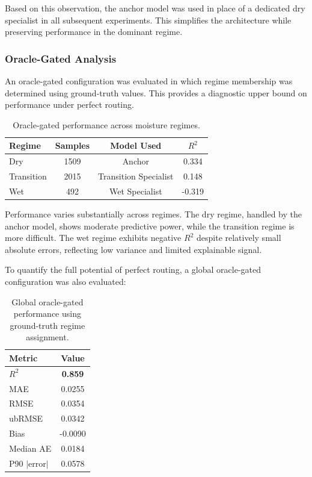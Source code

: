 Based on this observation, the anchor model was used in place of a dedicated dry specialist in all subsequent experiments. This simplifies the architecture while preserving performance in the dominant regime.

\subsubsection*{Oracle-Gated Analysis}
An oracle-gated configuration was evaluated in which regime membership was determined using ground-truth values. This provides a diagnostic upper bound on performance under perfect routing.

\begin{table}[H]
\centering
\begin{tabular}{lccc}
\toprule
\textbf{Regime} & \textbf{Samples} & \textbf{Model Used} & \textbf{$R^2$} \\
\midrule
Dry & 1509 & Anchor & 0.334 \\
Transition & 2015 & Transition Specialist & 0.148 \\
Wet & 492 & Wet Specialist & -0.319 \\
\bottomrule
\end{tabular}
\caption{Oracle-gated performance across moisture regimes.}
\end{table}

Performance varies substantially across regimes. The dry regime, handled by the anchor model, shows moderate predictive power, while the transition regime is more difficult. The wet regime exhibits negative $R^2$ despite relatively small absolute errors, reflecting low variance and limited explainable signal.

To quantify the full potential of perfect routing, a global oracle-gated configuration was also evaluated:

\begin{table}[H]
\centering
\begin{tabular}{lc}
\toprule
\textbf{Metric} & \textbf{Value} \\
\midrule
$R^2$ & \textbf{0.859} \\
MAE & 0.0255 \\
RMSE & 0.0354 \\
ubRMSE & 0.0342 \\
Bias & -0.0090 \\
Median AE & 0.0184 \\
P90 $|$error$|$ & 0.0578 \\
\bottomrule
\end{tabular}
\caption{Global oracle-gated performance using ground-truth regime assignment.}
\end{table}

